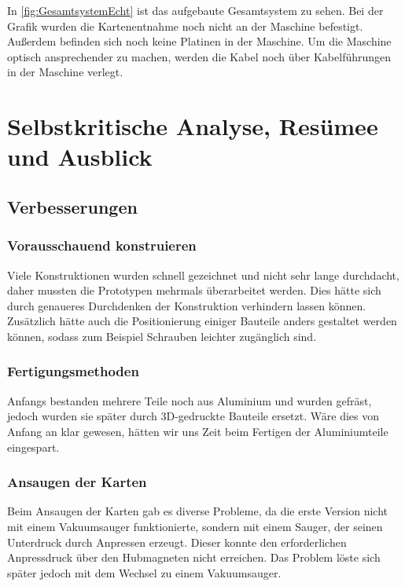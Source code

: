 In \autoref{fig:GesamtsystemEcht} ist das aufgebaute Gesamtsystem zu sehen.
Bei der Grafik wurden die Kartenentnahme noch nicht an der Maschine befestigt.
Außerdem befinden sich noch keine Platinen in der Maschine.
Um die Maschine optisch ansprechender zu machen, werden die Kabel noch über Kabelführungen in der Maschine verlegt.

\section{Selbstkritische Analyse, Resümee und Ausblick}
\subsection{Verbesserungen}

\subsubsection{Vorausschauend konstruieren}
Viele Konstruktionen wurden schnell gezeichnet und nicht sehr lange durchdacht, daher mussten die Prototypen mehrmals überarbeitet werden.
Dies hätte sich durch genaueres Durchdenken der Konstruktion verhindern lassen können.
Zusätzlich hätte auch die Positionierung einiger Bauteile anders gestaltet werden können, sodass zum Beispiel Schrauben leichter zugänglich sind.

\subsubsection{Fertigungsmethoden}
Anfangs bestanden mehrere Teile noch aus Aluminium und wurden gefräst, jedoch wurden sie später durch 3D-gedruckte
Bauteile ersetzt.
Wäre dies von Anfang an klar gewesen, hätten wir uns Zeit beim Fertigen der Aluminiumteile eingespart.
\subsubsection{Ansaugen der Karten}
Beim Ansaugen der Karten gab es diverse Probleme, da die erste Version nicht mit einem Vakuumsauger funktionierte, sondern
mit einem Sauger, der seinen Unterdruck durch Anpressen erzeugt.
Dieser konnte den erforderlichen Anpressdruck über den Hubmagneten nicht erreichen.
Das Problem löste sich später jedoch mit dem Wechsel zu einem Vakuumsauger.

